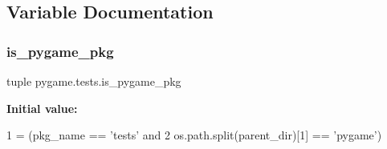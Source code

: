 \subsection{Variable Documentation}
\mbox{\label{namespacepygame_1_1tests_ad35a392765f70b61cc33622ed48fa83f}} 
\subsubsection{\texorpdfstring{is\+\_\+pygame\+\_\+pkg}{is\_pygame\_pkg}}
{\footnotesize\ttfamily tuple pygame.\+tests.\+is\+\_\+pygame\+\_\+pkg}

{\bfseries Initial value\+:}
\begin{DoxyCode}
1 =  (pkg\_name == \textcolor{stringliteral}{'tests'} \textcolor{keywordflow}{and}
2                      os.path.split(parent\_dir)[1] == \textcolor{stringliteral}{'pygame'})
\end{DoxyCode}
